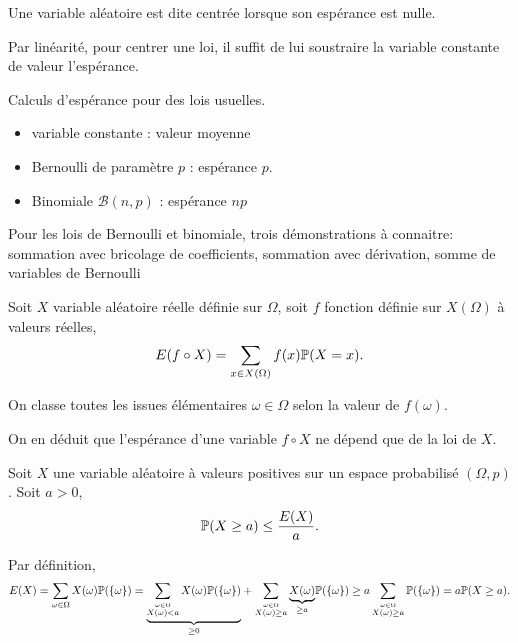 \begin{defi}
 Une variable aléatoire est dite centrée lorsque son espérance est nulle.
\end{defi}
\begin{rem}
Par linéarité, pour centrer une loi, il suffit de lui soustraire la variable constante de valeur l'espérance.  
\end{rem}
\begin{exple} Calculs d'espérance pour des lois usuelles.
\begin{itemize}
 \item variable constante : valeur moyenne
 \item Bernoulli de paramètre $p$ : espérance $p$.
 \item Binomiale $\mathcal{B}(n,p)$ : espérance $np$
\end{itemize}
Pour les lois de Bernoulli et binomiale, trois démonstrations à connaitre: sommation avec bricolage de coefficients, sommation avec dérivation, somme de variables de Bernoulli
\end{exple}
\begin{prop}
 Soit $X$ variable aléatoire réelle définie sur $\Omega$, soit $f$ fonction définie sur $X(\Omega)$ à valeurs réelles,
\begin{displaymath}
 E(f\circ X) = \sum_{x\in X(\Omega)} f(x)\mathbb{P}(X=x).
\end{displaymath}
\end{prop}
\begin{demo}
  On classe toutes les issues élémentaires $\omega \in \Omega$ selon la valeur de $f(\omega)$.
\end{demo}
\begin{rem}
On en déduit que l'espérance d'une variable $f\circ X$ ne dépend que de la loi de $X$.  
\end{rem}
\begin{prop}
 Soit $X$ une variable aléatoire à valeurs positives sur un espace probabilisé $(\Omega,p)$. Soit $a>0$,
\begin{displaymath}
 \mathbb{P}(X\geq a) \leq \frac{E(X)}{a}.
\end{displaymath}
\end{prop}
\begin{demo}
 Par définition,
\[
 E(X) = \sum_{\omega \in \Omega}X(\omega)\mathbb{P}(\{\omega\})
= \underset{\geq 0}{\underbrace{\sum_{\stackrel{\omega \in \Omega}{X(\omega)<a}}X(\omega)\mathbb{P}(\{\omega\})}}
 + \sum_{\stackrel{\omega \in \Omega}{X(\omega)\geq a}}\underset{\geq a}{\underbrace{X(\omega)}} \mathbb{P}(\{\omega\})\\
\geq a \sum_{\stackrel{\omega \in \Omega}{X(\omega)\geq a}} \mathbb{P}(\{\omega\})
= a \mathbb{P}(X\geq a).
\]
\end{demo}

